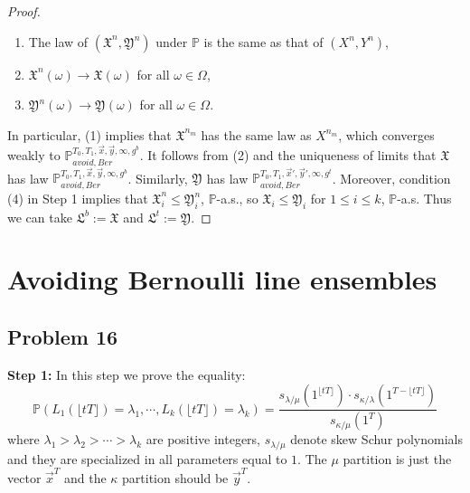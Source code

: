 \documentclass[12pt]{article}
\begin{document}
\begin{proof}
\begin{enumerate}[label=(\arabic*)]
		\item The law of $(\mathfrak{X}^n,\mathfrak{Y}^n)$ under $\mathbb{P}$ is the same as that of $(X^n,Y^n)$,
		
		\item $\mathfrak{X}^n(\omega) \longrightarrow \mathfrak{X}(\omega)$ for all $\omega\in\Omega$,
		
		\item $\mathfrak{Y}^n(\omega) \longrightarrow \mathfrak{Y}(\omega)$ for all $\omega\in\Omega$.
		
	\end{enumerate}

	In particular, (1) implies that $\mathfrak{X}^{n_m}$ has the same law as $X^{n_m}$, which converges weakly to $\mathbb{P}_{avoid,Ber}^{T_0,T_1,\vec{x},\vec{y},\infty,g^b}$. It follows from (2) and the uniqueness of limits that $\mathfrak{X}$ has law $\mathbb{P}_{avoid,Ber}^{T_0,T_1,\vec{x},\vec{y},\infty,g^b}$. Similarly, $\mathfrak{Y}$ has law $\mathbb{P}_{avoid,Ber}^{T_0,T_1,\vec{x}',\vec{y}',\infty,g^t}$. Moreover, condition (4) in Step 1 implies that $\mathfrak{X}^n_i \leq \mathfrak{Y}^n_i$, $\mathbb{P}$-a.s., so $\mathfrak{X}_i \leq \mathfrak{Y}_i$ for $1\leq i\leq k$, $\mathbb{P}$-a.s. Thus we can take $\mathfrak{L}^b := \mathfrak{X}$ and $\mathfrak{L}^t := \mathfrak{Y}$.
	
	\end{proof}


\section{Avoiding Bernoulli line ensembles}

				\subsection*{Problem 16}
\textbf{Step 1:} In this step we prove the equality:
$$\mathbb{P}(L_{1}(\lfloor tT \rfloor) = \lambda_{1}, \cdots, L_{k}(\lfloor tT \rfloor) = \lambda_{k})=\frac{s_{\lambda/\mu}(1^{\lfloor tT \rfloor})\cdot s_{\kappa/\lambda}(1^{T-\lfloor tT \rfloor})}{s_{\kappa/\mu}(1^{T})}$$ where $\lambda_{1}>\lambda_{2}>\cdots >\lambda_{k}$ are positive integers, $s_{\lambda/\mu}$ denote skew Schur polynomials and they are specialized in all parameters equal to $1$. The $\mu$ partition is just the vector $\vec{x}^{T}$ and the $\kappa$ partition should be $\vec{y}^{T}$.
\end{document}
